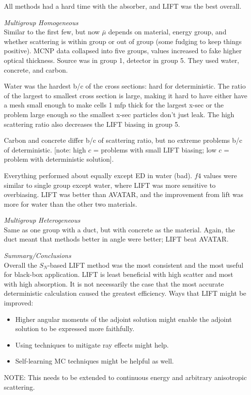 \documentclass[12pt,twoside]{article}
\begin{document}
All methods had a hard time with the absorber, and LIFT was the best overall. 

\vspace*{1em}
\noindent \textit{Multigroup Homogeneous}\\
Similar to the first few, but now $\bar{\mu}$ depends on material, energy group, and whether scattering is within group or out of group (some fudging to keep things positive). MCNP data collapsed into five groups, values increased to fake higher optical thickness. Source was in group 1, detector in group 5. They used water, concrete, and carbon. 

Water was the hardest b/c of the cross sections: hard for deterministic. The ratio of the largest to smallest cross section is large, making it hard to have either have a mesh small enough to make cells 1 mfp thick for the largest x-sec or the problem large enough so the smallest x-sec particles don't just leak. The high scattering ratio also decreases the LIFT biasing in group 5. 

Carbon and concrete differ b/c of scattering ratio, but no extreme problems b/c of deterministic. [note: high $c$ = problems with small LIFT biasing; low $c$ = problem with deterministic solution]. 

Everything performed about equally except ED in water (bad). $f4$ values were similar to single group except water, where LIFT was more sensitive to overbiasing. LIFT was better than AVATAR, and the improvement from lift was more for water than the other two materials.  

\vspace*{1em}
\noindent \textit{Multigroup Heterogeneous}\\
Same as one group with a duct, but with concrete as the material. Again, the duct meant that methods better in angle were better; LIFT beat AVATAR. 

\vspace*{1em}
\noindent \textit{Summary/Conclusions}\\
Overall the $S_N$-based LIFT method was the most consistent and the most useful for black-box application. LIFT is least beneficial with high scatter and most with high absorption. It is not necessarily the case that the most accurate deterministic calculation caused the greatest efficiency. Ways that LIFT might be improved:
\begin{itemize}
\item Higher angular moments of the adjoint solution might enable the adjoint solution to be expressed more faithfully.
\item Using techniques to mitigate ray effects might help.
\item Self-learning MC techniques might be helpful as well.
\end{itemize}
NOTE: This needs to be extended to continuous energy and arbitrary anisotropic scattering. 
\end{document}

